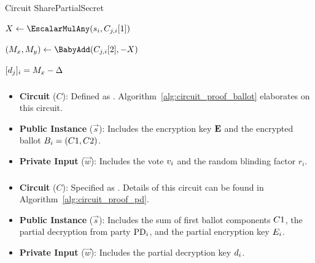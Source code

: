 \documentclass[lettersize,journal]{IEEEtran}
\theoremstyle{definition}
\begin{document}
\begin{algorithm}[h!]
\caption{Circuit SharePartialSecret}
\label{alg:circuit_proof_sps}


\BlankLine

$X \leftarrow \EscalarMulAny(\PartySecretKey{i}, \EncryptedSharePartialSecretKey{j}{i}[1])$\; %

$(M_x, M_y) \leftarrow \BabyAdd(\EncryptedSharePartialSecretKey{j}{i}[2], - X)$\; %

\Assert $[d_{j}]_{i} = M_x - \Delta$\;

\end{algorithm}

\subsubsection{}\label{app:proof-ballot}

\begin{itemize}
    \item \textbf{Circuit} ($C$): Defined as \ProofBALLOTInformal{}. Algorithm~\ref{alg:circuit_proof_ballot} elaborates on this circuit.
    \item \textbf{Public Instance} ($\vec{s}$): Includes the encryption key $\textbf{E}{}$ and the encrypted ballot $B_{i} = (C1, C2)$.
    \item \textbf{Private Input} ($\vec{w}$): Includes the vote $v_{i}$ and the random blinding factor $r_i$.
\end{itemize}

\subsubsection{}\label{app:proof-pd}

\begin{itemize}
    \item \textbf{Circuit} ($C$): Specified as \ProofPDInformal{}. Details of this circuit can be found in Algorithm~\ref{alg:circuit_proof_pd}.
    \item \textbf{Public Instance} ($\vec{s}$): Includes the sum of first ballot components $C1{}$, the partial decryption from party $\mathrm{PD}_{i}$, and the partial encryption key $E_{i}$.
    \item \textbf{Private Input} ($\vec{w}$): Includes the partial decryption key $d_{i}$.
\end{itemize}
\end{document}
